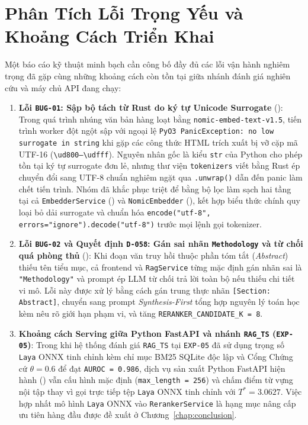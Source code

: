 \section{Phân Tích Lỗi Trọng Yếu và Khoảng Cách Triển Khai}
\label{sec:ch5_postmortem}

Một báo cáo kỹ thuật minh bạch cần công bố đầy đủ các lỗi vận hành nghiêm trọng đã gặp cùng những khoảng cách còn tồn tại giữa nhánh đánh giá nghiên cứu và máy chủ API đang chạy:

\begin{enumerate}[label=\textbf{\arabic*.}]
  \item \textbf{Lỗi \texttt{BUG-01}: Sập bộ tách từ Rust do ký tự Unicode Surrogate} ():
  Trong quá trình nhúng văn bản hàng loạt bằng \texttt{nomic-embed-text-v1.5}, tiến trình worker đột ngột sập với ngoại lệ \texttt{PyO3 PanicException: no low surrogate in string} khi gặp các công thức HTML trích xuất bị vỡ cặp mã UTF-16 (\texttt{\textbackslash ud800--\textbackslash udfff}). Nguyên nhân gốc là kiểu \texttt{str} của Python cho phép tồn tại ký tự surrogate đơn lẻ, nhưng thư viện \texttt{tokenizers} viết bằng Rust ép chuyển đổi sang UTF-8 chuẩn nghiêm ngặt qua \texttt{.unwrap()} dẫn đến panic làm chết tiến trình. Nhóm đã khắc phục triệt để bằng bộ lọc làm sạch hai tầng tại cả \texttt{EmbedderService} () và \texttt{NomicEmbedder} (), kết hợp biểu thức chính quy loại bỏ dải surrogate và chuẩn hóa \texttt{encode("utf-8", errors="ignore").decode("utf-8")} trước mọi lệnh gọi tokenizer.

  \item \textbf{Lỗi \texttt{BUG-02} và Quyết định \texttt{D-058}: Gán sai nhãn \texttt{Methodology} và từ chối quá phòng thủ} ():
  Khi đoạn văn truy hồi thuộc phần tóm tắt (\textit{Abstract}) thiếu tên tiểu mục, cả frontend và \texttt{RagService} từng mặc định gán nhãn sai là \texttt{"Methodology"} và prompt ép LLM từ chối trả lời toàn bộ nếu thiếu chi tiết vi mô. Lỗi này được xử lý bằng cách gán trung thực nhãn \texttt{[Section: Abstract]}, chuyển sang prompt \textit{Synthesis-First} tổng hợp nguyên lý toán học kèm nêu rõ giới hạn phạm vi, và tăng \texttt{RERANKER\_CANDIDATE\_K = 8}.

  \item \textbf{Khoảng cách Serving giữa Python FastAPI và nhánh \texttt{RAG\_TS} (\texttt{EXP-05})}:
  Trong khi hệ thống đánh giá \texttt{RAG\_TS} tại \texttt{EXP-05} đã sử dụng trọng số \texttt{Laya} ONNX tinh chỉnh kèm chỉ mục BM25 SQLite độc lập và Cổng Chứng cứ $\theta = 0.6$ để đạt \texttt{AUROC = 0.986}, dịch vụ sản xuất Python FastAPI hiện hành () vẫn cấu hình mặc định  (\texttt{max\_length = 256}) và chấm điểm từ vựng nội tập thay vì gọi trực tiếp tệp \texttt{Laya} ONNX tinh chỉnh với $T^* = 3.0627$. Việc hợp nhất mô hình \texttt{Laya} ONNX vào \texttt{RerankerService} là hạng mục nâng cấp ưu tiên hàng đầu được đề xuất ở Chương~\ref{chap:conclusion}.


\end{enumerate}
